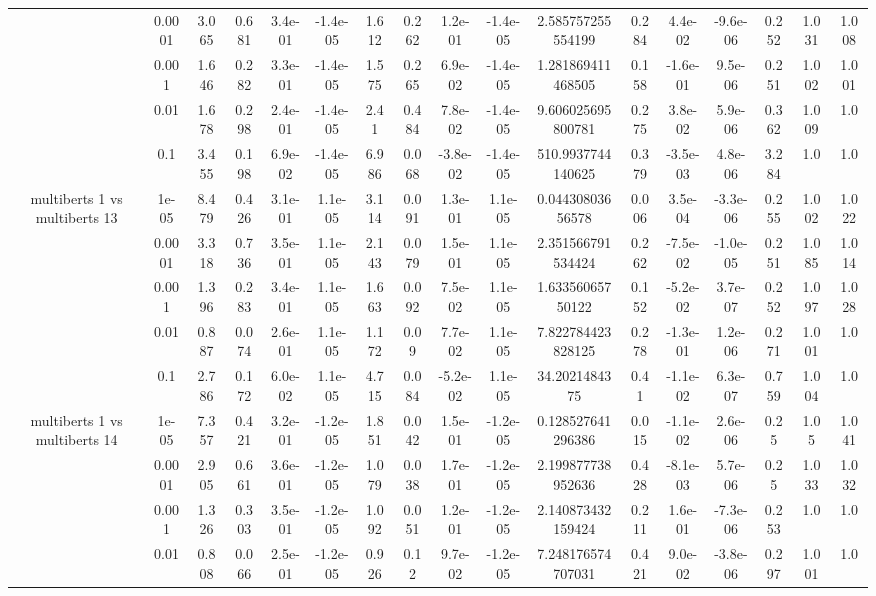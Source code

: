 \begin{tabular}{|c|c|c|c|c|c|c|c|c|c|c|c|c|c|c|c|c|}
 & 0.0001 & 3.065 & 0.681 & 3.4e-01 & -1.4e-05 & 1.612 & 0.262 & 1.2e-01 & -1.4e-05 & 2.585757255554199 & 0.284 & 4.4e-02 & -9.6e-06 & 0.252 & 1.031 & 1.008 \\
 & 0.001 & 1.646 & 0.282 & 3.3e-01 & -1.4e-05 & 1.575 & 0.265 & 6.9e-02 & -1.4e-05 & 1.281869411468505 & 0.158 & -1.6e-01 & 9.5e-06 & 0.251 & 1.002 & 1.001 \\
 & 0.01 & 1.678 & 0.298 & 2.4e-01 & -1.4e-05 & 2.41 & 0.484 & 7.8e-02 & -1.4e-05 & 9.606025695800781 & 0.275 & 3.8e-02 & 5.9e-06 & 0.362 & 1.009 & 1.0 \\
 & 0.1 & 3.455 & 0.198 & 6.9e-02 & -1.4e-05 & 6.986 & 0.068 & -3.8e-02 & -1.4e-05 & 510.9937744140625 & 0.379 & -3.5e-03 & 4.8e-06 & 3.284 & 1.0 & 1.0 \\
\hline
\multirow{5}{*}{multiberts 1 vs multiberts 13} & 1e-05 & 8.479 & 0.426 & 3.1e-01 & 1.1e-05 & 3.114 & 0.091 & 1.3e-01 & 1.1e-05 & 0.04430803656578 & 0.006 & 3.5e-04 & -3.3e-06 & 0.255 & 1.002 & 1.022 \\
 & 0.0001 & 3.318 & 0.736 & 3.5e-01 & 1.1e-05 & 2.143 & 0.079 & 1.5e-01 & 1.1e-05 & 2.351566791534424 & 0.262 & -7.5e-02 & -1.0e-05 & 0.251 & 1.085 & 1.014 \\
 & 0.001 & 1.396 & 0.283 & 3.4e-01 & 1.1e-05 & 1.663 & 0.092 & 7.5e-02 & 1.1e-05 & 1.63356065750122 & 0.152 & -5.2e-02 & 3.7e-07 & 0.252 & 1.097 & 1.028 \\
 & 0.01 & 0.887 & 0.074 & 2.6e-01 & 1.1e-05 & 1.172 & 0.09 & 7.7e-02 & 1.1e-05 & 7.822784423828125 & 0.278 & -1.3e-01 & 1.2e-06 & 0.271 & 1.001 & 1.0 \\
 & 0.1 & 2.786 & 0.172 & 6.0e-02 & 1.1e-05 & 4.715 & 0.084 & -5.2e-02 & 1.1e-05 & 34.2021484375 & 0.41 & -1.1e-02 & 6.3e-07 & 0.759 & 1.004 & 1.0 \\
\hline
\multirow{5}{*}{multiberts 1 vs multiberts 14} & 1e-05 & 7.357 & 0.421 & 3.2e-01 & -1.2e-05 & 1.851 & 0.042 & 1.5e-01 & -1.2e-05 & 0.128527641296386 & 0.015 & -1.1e-02 & 2.6e-06 & 0.25 & 1.05 & 1.041 \\
 & 0.0001 & 2.905 & 0.661 & 3.6e-01 & -1.2e-05 & 1.079 & 0.038 & 1.7e-01 & -1.2e-05 & 2.199877738952636 & 0.428 & -8.1e-03 & 5.7e-06 & 0.25 & 1.033 & 1.032 \\
 & 0.001 & 1.326 & 0.303 & 3.5e-01 & -1.2e-05 & 1.092 & 0.051 & 1.2e-01 & -1.2e-05 & 2.140873432159424 & 0.211 & 1.6e-01 & -7.3e-06 & 0.253 & 1.0 & 1.0 \\
 & 0.01 & 0.808 & 0.066 & 2.5e-01 & -1.2e-05 & 0.926 & 0.12 & 9.7e-02 & -1.2e-05 & 7.248176574707031 & 0.421 & 9.0e-02 & -3.8e-06 & 0.297 & 1.001 & 1.0 \\

\end{tabular}
